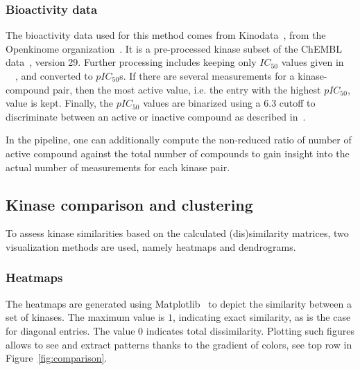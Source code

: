 \documentclass[9pt,training]{livecoms}
\begin{document}
\subsubsection{Bioactivity data}
The bioactivity data used for this method comes from Kinodata~\cite{kinodata_2022}, from the Openkinome organization~\cite{openkinome_feb_2022}. It is a pre-processed kinase subset of the ChEMBL data~\cite{Gaulton_2016_nar}, version 29. Further processing includes keeping only $IC_{50}$ values given in \SI{}{\nano\Molar}, and converted to $pIC_{50}$s. If there are several measurements for a kinase-compound pair, then the most active value, i.e. the entry with the highest $pIC_{50}$, value is kept. Finally, the $pIC_{50}$ values are binarized using a $6.3$ cutoff to discriminate between an active or inactive compound as described in~\cite{Merget_2017_JMedChem}. 

In the pipeline, one can additionally compute the non-reduced ratio of number of active compound against the total number of compounds to gain insight into the actual number of measurements for each kinase pair.

\subsection{Kinase comparison and clustering}
\label{sec:comparison}
To assess kinase similarities based on the calculated (dis)similarity matrices, two visualization methods are used, namely heatmaps and dendrograms.

\subsubsection{Heatmaps}
The heatmaps are generated using Matplotlib~\cite{Hunter_2007_IEEE} to depict the similarity between a set of kinases. The maximum value is $1$, indicating exact similarity, as is the case for diagonal entries. The value $0$ indicates total dissimilarity. Plotting such figures allows to see and extract patterns thanks to the gradient of colors, see top row in Figure~\ref{fig:comparison}.
\end{document}
